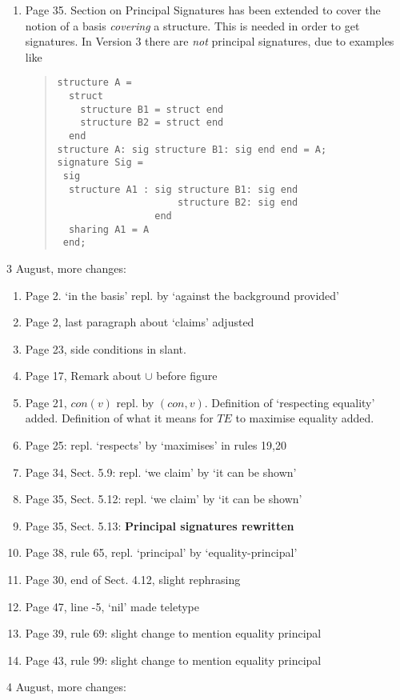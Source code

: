 \begin{description}
\begin{enumerate}
{combined} admissibility of the basis and the result of the elaboration.
\item Page 35. Section on Principal Signatures has been extended to
cover the notion of a basis {\sl covering} a structure.  This is 
needed in order to get signatures. In Version 3 there are {\sl not}
principal signatures, due to examples like
\begin{quote}
\begin{verbatim}
structure A =
  struct
    structure B1 = struct end
    structure B2 = struct end
  end 
structure A: sig structure B1: sig end end = A;
signature Sig = 
 sig
  structure A1 : sig structure B1: sig end
                     structure B2: sig end
                 end
  sharing A1 = A
 end;
\end{verbatim}
\end{quote}
\end{enumerate}
\item{3 August, more changes:}
\begin{enumerate}
\item Page 2. `in the basis' repl. by `against the background provided'
\item Page 2, last paragraph about `claims' adjusted
\item Page 23, side conditions in slant.
\item Page 17, Remark about $\cup$ before figure
\item Page 21, $con(v)$ repl. by $(con,v)$. Definition of `respecting equality' added.
Definition of what it means for $TE$ to maximise equality added. 
\item Page 25: repl. `respects' by `maximises' in rules 19,20
\item Page 34, Sect. 5.9: repl. `we claim' by `it can be shown'
\item Page 35, Sect. 5.12: repl. `we claim' by `it can be shown'
\item Page 35, Sect. 5.13: {\bf Principal signatures rewritten}
\item Page 38, rule 65, repl. `principal' by `equality-principal'
\item Page 30, end of Sect. 4.12, slight rephrasing
\item Page 47, line -5, `nil' made teletype
\item Page 39, rule 69: slight change to mention equality principal
\item Page 43, rule 99: slight change to mention equality principal
\end{enumerate}
\item{4 August, more changes:}

\end{description}
